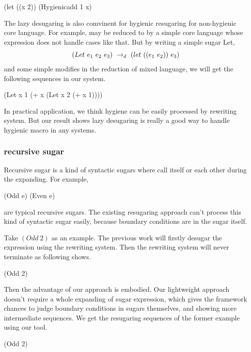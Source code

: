 \begin{Codes}
    (let ((x 2)) (Hygienicadd 1 x)
\end{Codes}

The lazy desugaring is also comvinent for hygienic resugaring for non-hygienic core language. For example,  may be reduced to  by a simple core language whose  expression does not handle cases like that. But by writing a simple sugar Let,
\[(Let~e_1~e_2~e_3) ~\rightarrow_d~ (let~((e_1~e_2))~e_3)\]
and some simple modifies in the reduction of mixed language, we will get the following sequences in our system.
\begin{Codes}
    (Let x 1 (+ x (Let x 2 (+ x 1))))
\end{Codes}

In practical application, we think hygiene can be easily processed by rewriting system. But our result shows lazy desugaring is really a good way to handle hygienic macro in any systems.

\subsubsection{recursive sugar}
Recursive sugar is a kind of syntactic sugars where call itself or each other during the expanding. For example,

\begin{Codes}
(Odd e) 
(Even e) 
\end{Codes}
are typical recursive sugars. The existing resugaring approach can't process this kind of syntactic sugar easily, because boundary conditions are in the sugar itself.

Take $(Odd~2)$ as an example. The previous work will firstly desugar the expression using the rewriting system. Then the rewriting system will never terminate as following shows.
\begin{Codes}
   (Odd 2)
\end{Codes}


Then the advantage of our approach is embodied. Our lightweight approach doesn't require a whole expanding of sugar expression, which gives the framework chances to judge boundary conditions in sugars themselves, and showing more intermediate sequences. We get the resugaring sequences of the former example using our tool.
\begin{Codes}
    (Odd 2)
\end{Codes}


